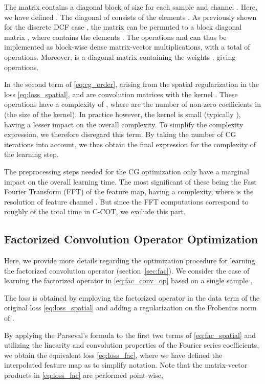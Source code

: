 \documentclass[10pt,twocolumn,letterpaper]{article}
\begin{document}
The matrix  contains a diagonal block  of size  for each sample  and channel . Here, we have defined . The diagonal of  consists of the elements . As previously shown for the discrete DCF case \cite{galoogahiICCV13}, the matrix  can be permuted to a block diagonal matrix , where  contains the elements . The operations  and  can thus be implemented as block-wise dense matrix-vector multiplications, with a total of  operations. Moreover,  is a diagonal matrix containing the weights , giving  operations.

In the second term of \eqref{eq:cg_order}, arising from the spatial regularization in the loss \eqref{eq:loss_spatial},  and  are convolution matrices with the kernel . These operations have a complexity of , where  are the number of non-zero coefficients in  (\ie the size of the kernel). In practice however, the kernel  is small (typically ), having a lesser impact on the overall complexity. To simplify the complexity expression, we therefore disregard this term. By taking the number of CG iterations  into account, we thus obtain the final expression   for the complexity of the learning step.

The preprocessing steps needed for the CG optimization only have a marginal impact on the overall learning time. The most significant of these being the Fast Fourier Transform (FFT) of the feature map, having a  complexity, where  is the resolution of feature channel . But since the FFT computations correspond to roughly  of the total time in C-COT, we exclude this part.

\subsection*{Factorized Convolution Operator Optimization}
\label{sec:supp_optimization}

Here, we provide more details regarding the optimization procedure for learning the factorized convolution operator (section~\ref{sec:fac}). We consider the case of learning the factorized operator  in \eqref{eq:fac_conv_op} based on a single sample ,

The loss is obtained by employing the factorized operator  in the data term of the original loss \eqref{eq:loss_spatial} and adding a regularization on the Frobenius norm  of .

By applying the Parseval's formula to the first two terms of \eqref{eq:fac_spatial} and utilizing the linearity and convolution properties of the Fourier series coefficients, we obtain the equivalent loss \eqref{eq:loss_fac}, where we have defined the interpolated feature map as  to simplify notation. Note that the matrix-vector products in \eqref{eq:loss_fac} are performed point-wise,
\end{document}
